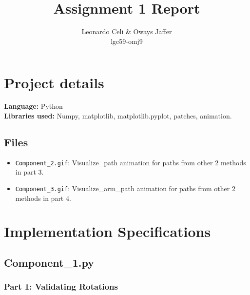 \documentclass{article}
\title{Assignment 1 Report}
\author{Leonardo Celi \& Oways Jaffer \\ lgc59-omj9}
\date{}
\begin{document}
\maketitle

\section*{Project details}

\noindent \textbf{Language:} Python \\
\textbf{Libraries used:} Numpy, matplotlib, matplotlib.pyplot, patches, animation.

\subsection*{Files}
\begin{itemize}
    \item \texttt{Component\_2.gif}: Visualize\_path animation for paths from other 2 methods in part 3.
    \item \texttt{Component\_3.gif}: Visualize\_arm\_path animation for paths from other 2 methods in part 4.
\end{itemize}

\section*{Implementation Specifications}

\subsection*{Component\_1.py}

\subsubsection*{Part 1: Validating Rotations}
\end{document}
